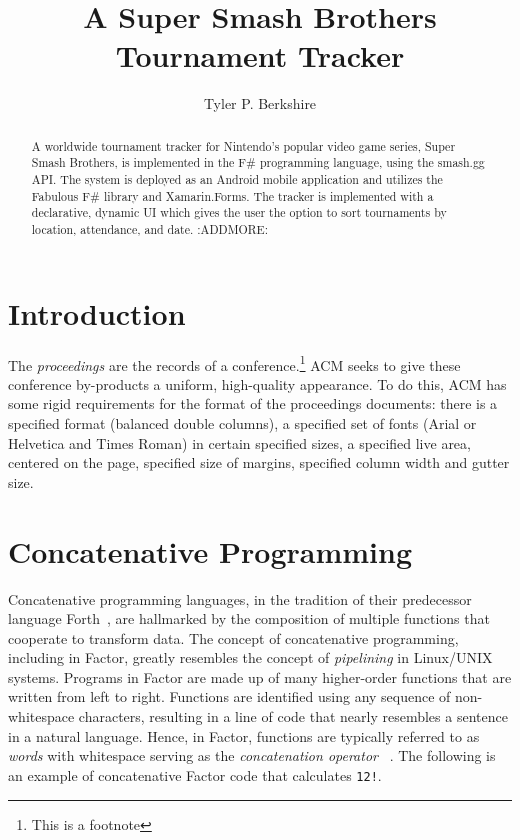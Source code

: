 \documentclass[sigconf]{acmart}
\begin{document}
\title{A Super Smash Brothers Tournament Tracker}
\author{Tyler P. Berkshire}

\renewcommand{\shortauthors}{T.P. Berkshire}

\begin{abstract}
A worldwide tournament tracker for Nintendo's popular video game series, Super Smash Brothers, is implemented in the F\# programming language, using the smash.gg API. The system is deployed as an Android mobile application and utilizes the Fabulous F\# library and Xamarin.Forms. The tracker is implemented with a declarative, dynamic UI which gives the user the option to sort tournaments by location, attendance, and date. :ADDMORE:
\end{abstract}


\maketitle

\section{Introduction}

The \textit{proceedings} are the records of a conference.\footnote{This
  is a footnote}  ACM seeks
to give these conference by-products a uniform, high-quality
appearance.  To do this, ACM has some rigid requirements for the
format of the proceedings documents: there is a specified format
(balanced double columns), a specified set of fonts (Arial or
Helvetica and Times Roman) in certain specified sizes, a specified
live area, centered on the page, specified size of margins, specified
column width and gutter size.

\section{Concatenative Programming}

Concatenative programming languages, in the tradition of their
predecessor language Forth~\cite{koopman:forth}, are hallmarked
by the composition of multiple functions that cooperate to
transform data. The concept of concatenative programming,
including in Factor, greatly resembles the concept of 
\textit{pipelining} in Linux/UNIX systems. Programs in Factor 
are made up of many higher-order functions that are written 
from left to right. Functions are identified using any sequence 
of non-whitespace characters, resulting in a line of code that 
nearly resembles a sentence in a natural language. Hence, in 
Factor, functions are typically referred to as \textit{words} 
with whitespace serving as the \textit{concatenation operator}
~\cite{pestov:Factor}. The following is an example of 
concatenative Factor code that calculates \texttt{12!}.
\end{document}
